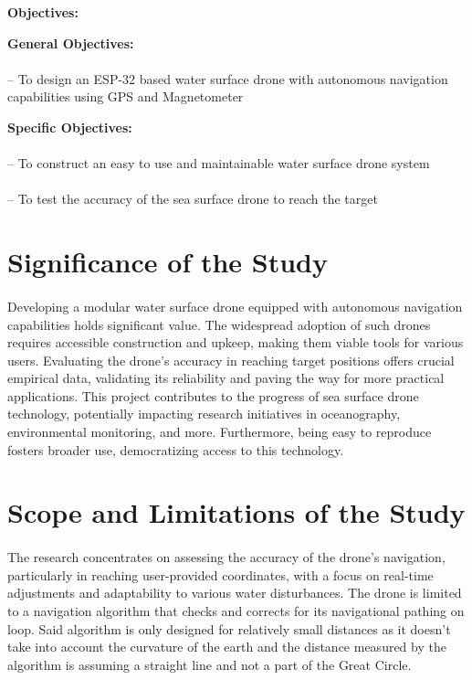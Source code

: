 \vspace{2cm}

\begin{center}
\bf Objectives:
\end{center}

{\bf General Objectives:}
\paragraph{} -- To design an ESP-32 based water surface drone with autonomous navigation capabilities using GPS and Magnetometer

{\bf Specific Objectives:}
\paragraph{} -- To construct an easy to use and maintainable water surface drone system
\paragraph{} -- To test the accuracy of the sea surface drone to reach the target 

\section{Significance of the Study}
\paragraph{} Developing a modular water surface drone equipped with autonomous navigation capabilities holds significant value. The widespread adoption of
            such drones requires accessible construction and upkeep, making them viable tools for various users. Evaluating the drone's accuracy in reaching
            target positions offers crucial empirical data, validating its reliability and paving the way for more practical applications. This project 
            contributes to the progress of sea surface drone technology, potentially impacting research initiatives in oceanography, environmental monitoring, 
            and more. Furthermore, being easy to reproduce fosters broader use, democratizing access to this technology.

\section{Scope and Limitations of the Study}
\paragraph{} The research concentrates on assessing the accuracy of the drone's navigation, particularly in reaching user-provided coordinates, with a focus
            on real-time adjustments and adaptability to various water disturbances.  The drone is limited to a navigation algorithm that checks and corrects
            for its navigational pathing on loop. Said algorithm is only designed for relatively small distances as it doesn't take into account the curvature 
            of the earth and the distance measured by the algorithm is assuming a straight line and not a part of the Great Circle.

